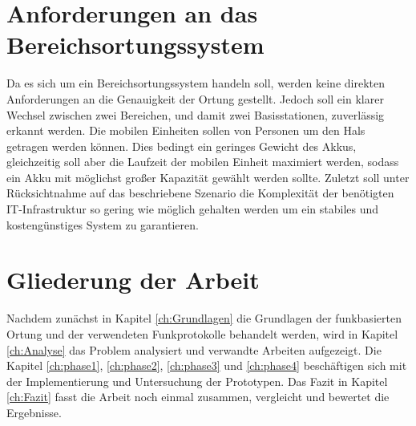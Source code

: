 \section{Anforderungen an das Bereichsortungssystem}
\label{ch:Einleitung:sec:Anforderungen}
Da es sich um ein Bereichsortungssystem handeln soll, werden keine direkten Anforderungen an die Genauigkeit der Ortung gestellt. 
Jedoch soll ein klarer Wechsel zwischen zwei Bereichen, und damit zwei Basisstationen, zuverlässig erkannt werden. 
Die mobilen Einheiten sollen von Personen um den Hals getragen werden können. 
Dies bedingt ein geringes Gewicht des Akkus, gleichzeitig soll aber die Laufzeit der mobilen Einheit maximiert werden, sodass ein Akku mit möglichst großer Kapazität gewählt werden sollte.
Zuletzt soll unter Rücksichtnahme auf das beschriebene Szenario die Komplexität der benötigten IT-Infrastruktur so gering wie möglich gehalten werden um ein stabiles und kostengünstiges System zu garantieren. 


\section{Gliederung der Arbeit}
\label{ch:Einleitung:sec:Gliederung}
Nachdem zunächst in Kapitel \ref{ch:Grundlagen} die Grundlagen der funkbasierten Ortung und der verwendeten Funkprotokolle behandelt werden, wird in Kapitel \ref{ch:Analyse} das Problem analysiert und verwandte Arbeiten aufgezeigt.
Die Kapitel \ref{ch:phase1}, \ref{ch:phase2}, \ref{ch:phase3} und \ref{ch:phase4} beschäftigen sich mit der Implementierung und Untersuchung der Prototypen. 
Das Fazit in Kapitel \ref{ch:Fazit} fasst die Arbeit noch einmal zusammen, vergleicht und bewertet die Ergebnisse.
